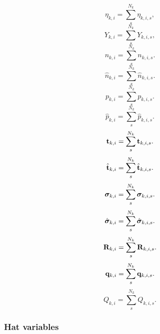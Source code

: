 \documentclass[a4paper,11pt]{report}
\begin{document}
\begin{equation}
    \label{eq:sf_vars_eta_ki}
    \eta_{k,i} = \sum_s^{N_k} \eta_{k,i,s}, 
\end{equation}
\begin{equation}
    \label{eq:sf_vars_Y_ki}
    Y_{k,i} = \sum_s^{N_k} Y_{k,i,s}, 
\end{equation}
\begin{equation}
    \label{eq:sf_vars_n_ki}
    n_{k,i} = \sum_s^{N_k} n_{k,i,s}. 
\end{equation}
\begin{equation}
    \label{eq:sf_vars_hatn_ki}
    \hat{n}_{k,i} = \sum_s^{N_k} \hat{n}_{k,i,s}. 
\end{equation}
\begin{equation}
    \label{eq:sf_vars_p_ki}
    p_{k,i} = \sum_s^{N_k} p_{k,i,s}.
\end{equation}
\begin{equation}
    \label{eq:sf_vars_hatp_ki}
    \hat{p}_{k,i} = \sum_s^{N_k} \hat{p}_{k,i,s}. 
\end{equation}
\begin{equation}
    \label{eq:sf_vars_t_ki}
    \mathbf{t}_{k,i} = \sum_s^{N_k} \mathbf{t}_{k,i,s}.
\end{equation}
\begin{equation}
    \label{eq:sf_vars_hatt_ki}
    \hat{\mathbf{t}}_{k,i} = \sum_s^{N_k} \hat{\mathbf{t}}_{k,i,s}. 
\end{equation}
\begin{equation}
    \label{eq:sf_vars_sig_ki}
    \bm \sigma_{k,i} = \sum_s^{N_k} \bm \sigma_{k,i,s}.
\end{equation}
\begin{equation}
    \label{eq:sf_vars_sig_ki}
    \hat{\bm \sigma}_{k,i} = \sum_s^{N_k} \hat{\bm \sigma}_{k,i,s}.
\end{equation}
\begin{equation}
    \label{eq:sf_vars_R_ki}
    \mathbf{R}_{k,i} = \sum_s^{N_k} \mathbf{R}_{k,i,s}.
\end{equation}
\begin{equation}
    \label{eq:sf_vars_q_ki}
    \mathbf{q}_{k,i} = \sum_s^{N_k} \mathbf{q}_{k,i,s}.
\end{equation}
\begin{equation}
    \label{eq:sf_vars_Q_ki}
    Q_{k,i} = \sum_s^{N_k} Q_{k,i,s}.
\end{equation}

\subsubsection{Hat variables}
\end{document}
